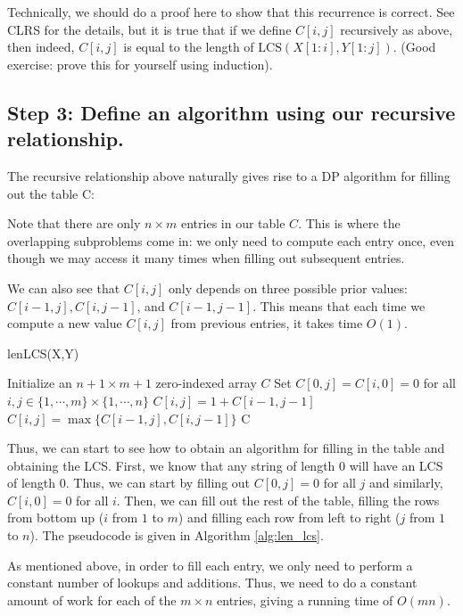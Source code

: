\documentclass [12pt]{article}
\theoremstyle{definition}
\begin{document}
Technically, we should do a proof here to show that this recurrence is correct. See CLRS for the details, but it is true that if we define $C[i, j]$ recursively as above, then indeed, $C[i, j]$ is equal to the length of $\text{LCS}(X[1 : i], Y [1 : j])$. (Good exercise: prove this for yourself using induction).

\subsection{Step 3: Define an algorithm using our recursive relationship.}
The recursive relationship above naturally gives rise to a DP algorithm for filling out the table
C:

Note that there are only $n \times m$ entries in our table $C$. This is where the overlapping subproblems come in: we only need to compute each entry once, even though we may access it many times when filling out subsequent entries.

We can also see that $C[i, j]$ only depends on three possible prior values: $C[i -1, j], C[i, j -1]$,
and $C[i - 1, j - 1]$. This means that each time we compute a new value $C[i, j]$ from previous
entries, it takes time $O(1)$.

\begin{algorithm}
\caption{lenLCS(X,Y)}
\label{alg:len_lcs}
\begin{algorithmic}
\STATE Initialize an $n + 1 \times m + 1$ zero-indexed array $C$
\STATE Set $C[0,j] = C[i, 0] = 0$ for all $i,j \in \{1, \cdots, m\} \times \{1, \cdots, n \}$
      \STATE $C[i, j] = 1 + C[i-1, j-1]$
    \ELSE
      \STATE $C[i,j]= \max\{C[i-1, j], C[i, j-1] \}$
    \ENDIF
  \ENDFOR
\ENDFOR
\RETURN C
\end{algorithmic}
\end{algorithm}

Thus, we can start to see how to obtain an algorithm for filling in the table and obtaining the LCS. First, we know that any string of length $0$ will have an LCS of length $0$. Thus, we can start by filling out $C[0, j] = 0$ for all $j$ and similarly, $C[i, 0] = 0$ for all $i$. Then, we can fill out the rest of the table, filling the rows from bottom up ($i$ from $1$ to $m$) and filling each row from left to right ($j$ from $1$ to $n$). The pseudocode is given in Algorithm \ref{alg:len_lcs}.

As mentioned above, in order to fill each entry, we only need to perform a constant number of lookups and additions. Thus, we need to do a constant amount of work for each of the $m \times n$ entries, giving a running time of $O(mn)$.
\end{document}
